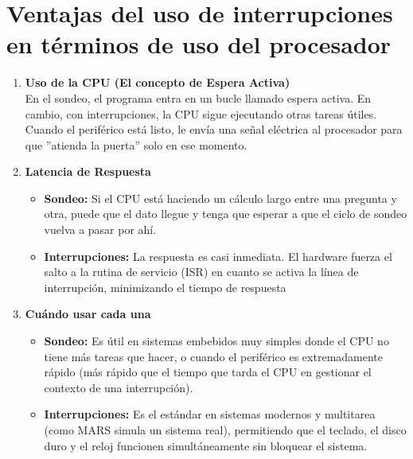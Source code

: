 \documentclass[]{article}
\begin{document}
\section{Ventajas del uso de interrupciones en términos de uso del procesador}
	\begin{enumerate}
		\item \textbf{Uso de la CPU (El concepto de Espera Activa)}\\
			En el sondeo, el programa entra en un bucle llamado espera activa. En cambio, con interrupciones, la CPU sigue ejecutando otras tareas útiles. Cuando el periférico está listo, le envía una señal eléctrica al procesador para que ''atienda la puerta'' solo en ese momento.
		\item \textbf{Latencia de Respuesta}
			\begin{itemize}
				\item \textbf{Sondeo:} Si el CPU está haciendo un cálculo largo entre una pregunta y otra, puede que el dato llegue y tenga que esperar a que el ciclo de sondeo vuelva a pasar por ahí.
				\item \textbf{Interrupciones:} La respuesta es casi inmediata. El hardware fuerza el salto a la rutina de servicio (ISR) en cuanto se activa la línea de interrupción, minimizando el tiempo de respuesta
			\end{itemize}
		\item \textbf{Cuándo usar cada una}
			\begin{itemize}
				\item \textbf{Sondeo:} Es útil en sistemas embebidos muy simples donde el CPU no tiene más tareas que hacer, o cuando el periférico es extremadamente rápido (más rápido que el tiempo que tarda el CPU en gestionar el contexto de una interrupción).
				\item \textbf{Interrupciones:} Es el estándar en sistemas modernos y multitarea (como MARS simula un sistema real), permitiendo que el teclado, el disco duro y el reloj funcionen simultáneamente sin bloquear el sistema.
			\end{itemize}
		
	\end{enumerate}
	
\end{document}
